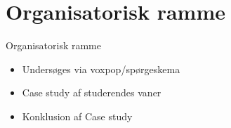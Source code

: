 \section{Organisatorisk ramme}
\begin{frame}{Organisatorisk ramme}{}
\begin{itemize}
\item Undersøges via voxpop/spørgeskema
\item Case study af studerendes vaner
\item Konklusion af Case study
\end{itemize}
\end{frame}